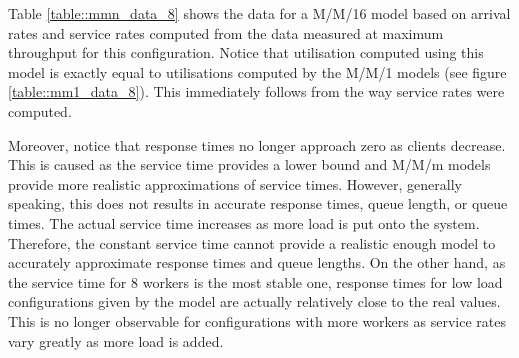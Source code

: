 \documentclass[11pt,a4paper]{article}
\begin{document}
Table \ref{table::mmn_data_8} shows the data for a M/M/16 model based on arrival rates and service rates computed from the data measured at maximum throughput for this configuration. Notice that utilisation computed using this model is exactly equal to utilisations computed by the M/M/1 models (see figure \ref{table::mm1_data_8}). This immediately follows from the way service rates were computed.

Moreover, notice that response times no longer approach zero as clients decrease. This is caused as the service time provides a lower bound and M/M/m models provide more realistic approximations of service times. However, generally speaking, this does not results in accurate response times, queue length, or queue times. The actual service time increases as more load is put onto the system. Therefore, the constant service time cannot provide a realistic enough model to accurately approximate response times and queue lengths. On the other hand, as the service time for 8 workers is the most stable one, response times for low load configurations given by the model are actually relatively close to the real values. This is no longer observable for configurations with more workers as service rates vary greatly as more load is added.
\end{document}
